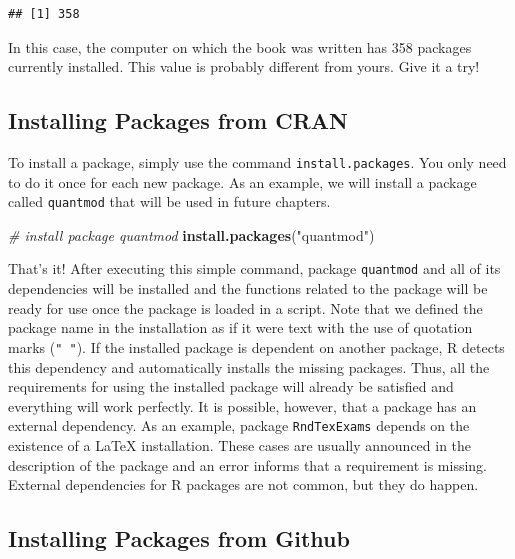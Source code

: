 \documentclass[11pt,]{book}
\newenvironment{Shaded}{\begin{snugshade}}{\end{snugshade}}
\newcommand{\KeywordTok}[1]{\textcolor[rgb]{0.27,0.27,0.27}{\textbf{#1}}}
\newcommand{\StringTok}[1]{\textcolor[rgb]{0.5,0.5,0.5}{#1}}
\newcommand{\CommentTok}[1]{\textcolor[rgb]{0.56,0.35,0.01}{\textit{#1}}}
\newcommand{\NormalTok}[1]{#1}
\begin{document}
\begin{verbatim}
## [1] 358
\end{verbatim}

In this case, the computer on which the book was written has 358
packages currently installed. This value is probably different from
yours. Give it a try!

\subsection{Installing Packages from
CRAN}\label{installing-packages-from-cran}

To install a package, simply use the command \texttt{install.packages}.
You only need to do it once for each new package. As an example, we will
install a package called \texttt{quantmod} that will be used in future
chapters. 

\begin{Shaded}
\begin{Highlighting}[]
\CommentTok{# install package quantmod}
\KeywordTok{install.packages}\NormalTok{(}\StringTok{"quantmod"}\NormalTok{)}
\end{Highlighting}
\end{Shaded}

That's it! After executing this simple command, package
\texttt{quantmod} and all of its dependencies will be installed and the
functions related to the package will be ready for use once the package
is loaded in a script. Note that we defined the package name in the
installation as if it were text with the use of quotation marks
(\texttt{"\ "}). If the installed package is dependent on another
package, R detects this dependency and automatically installs the
missing packages. Thus, all the requirements for using the installed
package will already be satisfied and everything will work perfectly. It
is possible, however, that a package has an external dependency. As an
example, package \texttt{RndTexExams} depends on the existence of a
LaTeX installation. These cases are usually announced in the description
of the package and an error informs that a requirement is missing.
External dependencies for R packages are not common, but they do happen.

\subsection{Installing Packages from
Github}\label{installing-packages-from-github}
\end{document}
